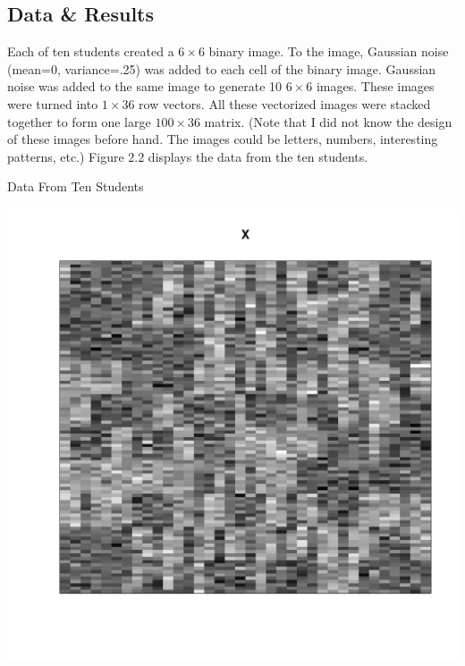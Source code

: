 \subsection{Data \& Results}
Each of ten students created a $6 \times 6$ binary image. To the
image, Gaussian noise (mean=0, variance=.25) was added to each cell of the
binary image. Gaussian noise was added to the same image to generate 10 $6
\times 6$ images. These images were turned into $1 \times 36$ row vectors. All
these vectorized images were stacked together to form one large $100 \times 36$
matrix. (Note that I did not know the design of these images before hand. The
images could be letters, numbers, interesting patterns, etc.)
Figure 2.2 displays the data from the ten students.\\

\beginmyfig
  \vspace{-5mm}
  \caption{Data From Ten Students}
  \vspace{-2mm}
  \includegraphics{images/Y.pdf}
  \vspace{-20mm}
\endmyfig

